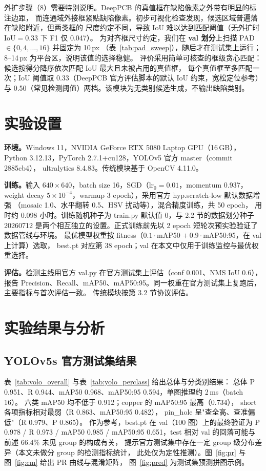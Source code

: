 \documentclass[UTF8,a4paper,zihao=5,twocolumn,fontset=fandol]{ctexart}
\begin{document}
外扩步骤（8）需要特别说明。DeepPCB 的真值框在缺陷像素之外带有明显的标注边距，
而连通域外接框紧贴缺陷像素。初步可视化检查发现，候选区域普遍落在缺陷附近，但两类框的
尺度约定不同，导致 IoU 难以达到匹配阈值（无外扩时 IoU$=$0.33 下 F1 仅 0.047）。
为对齐框尺寸约定，我们在 \textbf{val 划分}上扫描 PAD$\in\{0,4,\dots,16\}$ 并固定为 10\,px
（表~\ref{tab:pad_sweep}），随后才在测试集上运行；8--14\,px 为平台区，说明该值的选择稳健。
评价采用简单可核查的框级贪心匹配：候选按得分降序依次匹配 IoU 最大且未被占用的真值框，
每个真值框至多匹配一次；IoU 阈值取 0.33（DeepPCB 官方评估脚本的默认 IoU 约束，宽松定位参考）
与 0.50（常见检测阈值）两档。该模块为无类别候选生成，不输出缺陷类别。

\section{实验设置}

\textbf{环境。}Windows 11，NVIDIA GeForce RTX 5080 Laptop GPU（16\,GB），
Python 3.12.13，PyTorch 2.7.1+cu128，YOLOv5 官方 master（commit 2885cb4），
ultralytics 8.4.83。传统模块基于 OpenCV 4.11.0。

\textbf{训练。}输入 $640\times640$，batch size 16，SGD（lr$_0=0.01$，momentum 0.937，
weight decay $5\times10^{-4}$，warmup 3 epoch），采用官方 hyp.scratch-low 默认数据增强
（mosaic 1.0、水平翻转 0.5、HSV 扰动等），混合精度训练，共 50 epoch，
用时约 0.098 小时。训练随机种子为 train.py 默认值 0，与 2.2 节的数据划分种子
20260712 是两个相互独立的设置。正式训练前先以 2 epoch 短轮次预实验验证了数据管线与环境。
最优模型权重按 fitness（$0.1\cdot$mAP50 $+\,0.9\cdot$mAP50:95，在 val 上计算）选取，
best.pt 对应第 38 epoch；val 在本文中仅用于训练监控与最优权重选择。

\textbf{评估。}检测主线用官方 val.py 在官方测试集上评估（conf 0.001、NMS IoU 0.6），
报告 Precision、Recall、mAP50、mAP50:95。同一权重在官方测试集上复跑后，主要指标与首次评估一致。
传统模块按第 3.2 节协议评估。

\section{实验结果与分析}

\subsection{YOLOv5s 官方测试集结果}

表~\ref{tab:yolo_overall} 与表~\ref{tab:yolo_perclass} 给出总体与分类别结果：
总体 P 0.951、R 0.944、mAP50 0.968、mAP50:95 0.594，单图推理约 2\,ms（batch 16）。
六类 mAP50 均不低于 0.912；copper 的 mAP50:95 最高（0.734），
short 各项指标相对最弱（R 0.863、mAP50:95 0.482），
pin\_hole 呈"查全高、查准偏低"（R 0.979、P 0.865）。
作为参考，best.pt 在 val（100 图）上的最终验证为 P 0.978 / R 0.973 / mAP50 0.985 /
mAP50:95 0.651，test 相对 val 的回落可能与前述 66.4\% 未见 group 的构成有关，
提示官方测试集中存在一定 group 级分布差异（本文未做分 group 的检测指标统计，
此处仅为定性推测）。图~\ref{fig:pr} 与图~\ref{fig:cm} 给出 PR 曲线与混淆矩阵，
图~\ref{fig:pred} 为测试集预测拼图示例。
\end{document}
